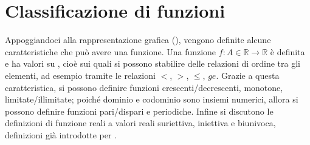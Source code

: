 \documentclass[letterpaper,10pt,italian]{jupyterBook}
\begin{document}
\section{Classificazione di funzioni}
\label{\detokenize{ch/precalculus/real-functions:classificazione-di-funzioni}}\label{\detokenize{ch/precalculus/real-functions:math-hs-precalculus-real-functions-types}}
\sphinxAtStartPar
Appoggiandoci alla rappresentazione grafica (), vengono definite alcune caratteristiche che può avere una funzione. Una funzione \(f: A \in  \mathbb{R} \rightarrow \mathbb{R}\) è definita e ha valori su , cioè sui quali si possono stabilire delle relazioni di ordine tra gli elementi, ad esempio tramite le relazioni \(<\), \(>\), \(\le\), \(ge\). Grazie a questa caratteristica, si possono definire funzioni crescenti/decrescenti, monotone, limitate/illimitate; poiché dominio e codominio sono insiemi numerici, allora si possono definire funzioni pari/dispari e periodiche. Infine si discutono le definizioni di funzione reali a valori reali suriettiva, iniettiva e biunivoca, definizioni già introdotte per {\hyperref[\detokenize{ch/set:math-hs-fun}]{}}.
\end{document}
